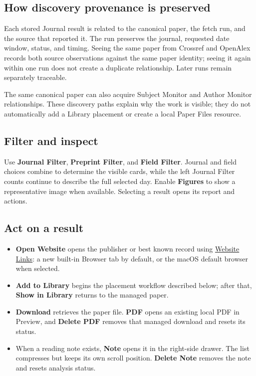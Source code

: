 \documentclass[10pt,letterpaper,oneside]{scrreprt}
\providecommand{\tightlist}{\setlength{\itemsep}{1pt}\setlength{\parskip}{0pt}}
\begin{document}
\subsection{How discovery provenance is preserved}\label{how-discovery-provenance-is-preserved}

Each stored Journal result is related to the canonical paper, the fetch run, and the source that reported it. The run preserves the journal, requested date window, status, and timing. Seeing the same paper from Crossref and OpenAlex records both source observations against the same paper identity; seeing it again within one run does not create a duplicate relationship. Later runs remain separately traceable.

The same canonical paper can also acquire Subject Monitor and Author Monitor relationships. These discovery paths explain why the work is visible; they do not automatically add a Library placement or create a local Paper Files resource.

\subsection{Filter and inspect}\label{filter-and-inspect}

Use \textbf{Journal Filter}, \textbf{Preprint Filter}, and \textbf{Field Filter}. Journal and field choices combine to determine the visible cards, while the left Journal Filter counts continue to describe the full selected day. Enable \textbf{Figures} to show a representative image when available. Selecting a result opens its report and actions.

\subsection{Act on a result}\label{act-on-a-result}

\begin{itemize}
\tightlist
\item
  \textbf{Open Website} opens the publisher or best known record using \hyperref[website-link-settings]{Website Links}: a new built-in Browser tab by default, or the macOS default browser when selected.
\item
  \textbf{Add to Library} begins the placement workflow described below; after that, \textbf{Show in Library} returns to the managed paper.
\item
  \textbf{Download} retrieves the paper file. \textbf{PDF} opens an existing local PDF in Preview, and \textbf{Delete PDF} removes that managed download and resets its status.
\item
  When a reading note exists, \textbf{Note} opens it in the right-side drawer. The list compresses but keeps its own scroll position. \textbf{Delete Note} removes the note and resets analysis status.
\end{itemize}
\end{document}

